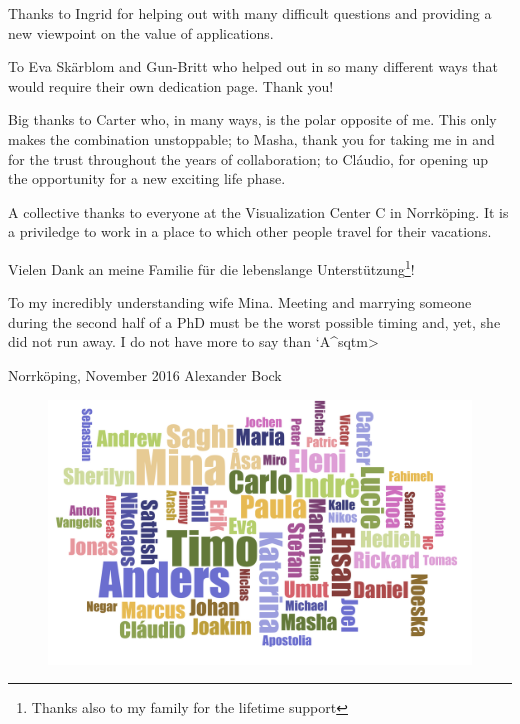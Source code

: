 Thanks to Ingrid for helping out with many difficult questions and providing a new viewpoint on the value of applications.

To Eva Sk\"arblom and Gun-Britt who helped out in so many different ways that would require their own dedication page. Thank you!

Big thanks to Carter who, in many ways, is the polar opposite of me. This only makes the combination unstoppable; to Masha, thank you for taking me in and for the trust throughout the years of collaboration; to Cl\'audio, for opening up the opportunity for a new exciting life phase.

A collective thanks to everyone at the Visualization Center C in Norrk\"oping. It is a priviledge to work in a place to which other people travel for their vacations.


Vielen Dank an meine Familie f\"ur die lebenslange Unterst\"utzung\footnote{Thanks also to my family for the lifetime support}!

To my incredibly understanding wife Mina. Meeting and marrying someone during the second half of a PhD must be the worst possible timing and, yet, she did not run away. I do not have more to say than \<`A^sqtm>

\vspace{1cm}
\hline \hline

Norrk\"oping, November 2016 \hfill Alexander Bock

\vfill

\begin{figure}[hb]
\centering
\includegraphics[width=0.75\linewidth]{figures/misc/wordcloud.pdf}
\end{figure}

